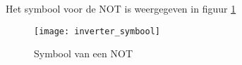 Het symbool voor de NOT is weergegeven in figuur \ref{symbool:not}

\begin{figure}[h]
\texttt{[image: inverter\_symbool]}
\centering
\caption{Symbool van een NOT}
\label{symbool:not}
\end{figure}

